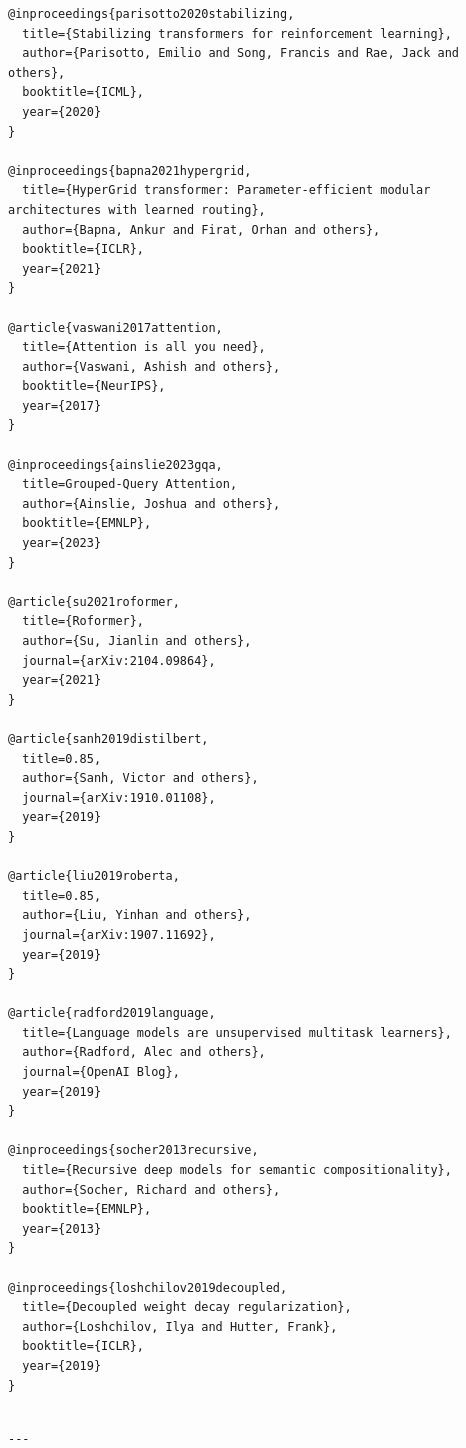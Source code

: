 \begin{lstlisting}
@inproceedings{parisotto2020stabilizing,
  title={Stabilizing transformers for reinforcement learning},
  author={Parisotto, Emilio and Song, Francis and Rae, Jack and others},
  booktitle={ICML},
  year={2020}
}

@inproceedings{bapna2021hypergrid,
  title={HyperGrid transformer: Parameter-efficient modular architectures with learned routing},
  author={Bapna, Ankur and Firat, Orhan and others},
  booktitle={ICLR},
  year={2021}
}

@article{vaswani2017attention,
  title={Attention is all you need},
  author={Vaswani, Ashish and others},
  booktitle={NeurIPS},
  year={2017}
}

@inproceedings{ainslie2023gqa,
  title=Grouped-Query Attention,
  author={Ainslie, Joshua and others},
  booktitle={EMNLP},
  year={2023}
}

@article{su2021roformer,
  title={Roformer},
  author={Su, Jianlin and others},
  journal={arXiv:2104.09864},
  year={2021}
}

@article{sanh2019distilbert,
  title=0.85,
  author={Sanh, Victor and others},
  journal={arXiv:1910.01108},
  year={2019}
}

@article{liu2019roberta,
  title=0.85,
  author={Liu, Yinhan and others},
  journal={arXiv:1907.11692},
  year={2019}
}

@article{radford2019language,
  title={Language models are unsupervised multitask learners},
  author={Radford, Alec and others},
  journal={OpenAI Blog},
  year={2019}
}

@inproceedings{socher2013recursive,
  title={Recursive deep models for semantic compositionality},
  author={Socher, Richard and others},
  booktitle={EMNLP},
  year={2013}
}

@inproceedings{loshchilov2019decoupled,
  title={Decoupled weight decay regularization},
  author={Loshchilov, Ilya and Hutter, Frank},
  booktitle={ICLR},
  year={2019}
}
\end{lstlisting}
\begin{lstlisting}

---
\end{lstlisting}